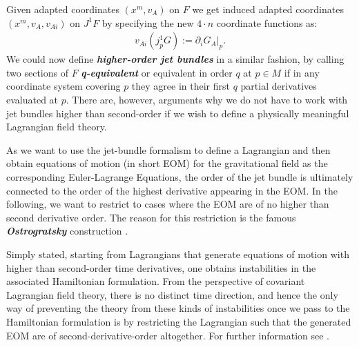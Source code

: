 Given adapted coordinates $(x^m,v_A)$ on $F$ we get induced adapted coordinates $(x^m, v_A, v_{Ai})$ on $J^1F$ by specifying the new $4 \cdot n$ coordinate functions as: 
\begin{align}
v_{Ai}(j^1_pG) := \partial_iG_A \big \vert_p.
\end{align}
We could now define \textit{\textbf{higher-order jet bundles}} in a similar fashion, by calling two sections of $F$ \textit{\textbf{q-equivalent}} or equivalent in order $q$ at $p \in M$ if in any coordinate system covering $p$ they agree in their first $q$ partial derivatives evaluated at $p$. There are, however, arguments why we do not have to work with jet bundles higher than second-order if we wish to define a physically meaningful Lagrangian field theory.

As we want to use the jet-bundle formalism to define a Lagrangian and then obtain equations of motion (in short EOM) for the gravitational field as the corresponding Euler-Lagrange Equations, the order of the jet bundle is ultimately connected to the order of the highest derivative appearing in the EOM. In the following, we want to restrict to cases where the EOM are of no higher than second derivative order. The reason for this restriction is the famous \textbf{\textit{Ostrogratsky}} construction \cite{Ostrogradsky:1850fid}. 

Simply stated, starting from Lagrangians that generate equations of motion with higher than second-order time derivatives, one obtains instabilities in the associated Hamiltonian formulation. From the perspective of covariant Lagrangian field theory, there is no distinct time direction, and hence the only way of preventing the theory from these kinds of instabilities once we pass to the Hamiltonian formulation is by restricting the Lagrangian such that the generated EOM are of second-derivative-order altogether. For further information see \cite{2015arXiv150602210W}. 

